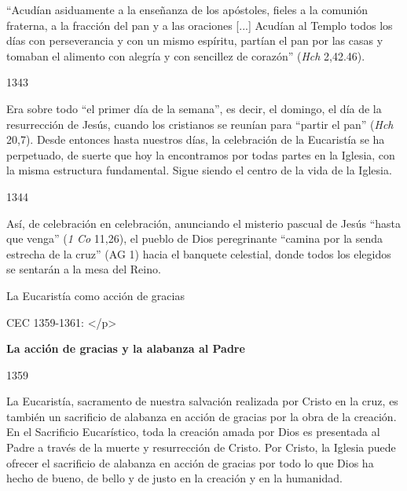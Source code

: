 			\begin{ccecite}“Acudían asiduamente a la enseñanza de los apóstoles, fieles a la comunión fraterna, a la fracción del pan y a las oraciones [...] Acudían al Templo todos los días con perseverancia y con un mismo espíritu, partían el pan por las casas y tomaban el alimento con alegría y con sencillez de corazón” (\textit{Hch} 2,42.46).\end{ccecite}
			
			\begin{ccebody}\begin{ccenumber}1343\end{ccenumber} Era sobre todo “el primer día de la semana”, es decir, el domingo, el día de la resurrección de Jesús, cuando los cristianos se reunían para “partir el pan” (\textit{Hch} 20,7). Desde entonces hasta nuestros días, la celebración de la Eucaristía se ha perpetuado, de suerte que hoy la encontramos por todas partes en la Iglesia, con la misma estructura fundamental. Sigue siendo el centro de la vida de la Iglesia.\end{ccebody}
			
			\begin{ccebody}\begin{ccenumber}1344\end{ccenumber} Así, de celebración en celebración, anunciando el misterio pascual de Jesús “hasta que venga” (\textit{1 Co} 11,26), el pueblo de Dios peregrinante “camina por la senda estrecha de la cruz” (AG 1) hacia el banquete celestial, donde todos los elegidos se sentarán a la mesa del Reino.\end{ccebody}
			
			\begin{ccetheme}La Eucaristía como acción de gracias \end{ccetheme}
			
			\begin{ccereference}\end{ccereference}CEC 1359-1361: </p>
			
			\begin{ccebody}\textbf{La acción de gracias y la alabanza al Padre}\end{ccebody}
			
			\begin{ccebody}\begin{ccenumber}1359\end{ccenumber} La Eucaristía, sacramento de nuestra salvación realizada por Cristo en la cruz, es también un sacrificio de alabanza en acción de gracias por la obra de la creación. En el Sacrificio Eucarístico, toda la creación amada por Dios es presentada al Padre a través de la muerte y resurrección de Cristo. Por Cristo, la Iglesia puede ofrecer el sacrificio de alabanza en acción de gracias por todo lo que Dios ha hecho de bueno, de bello y de justo en la creación y en la humanidad.\end{ccebody}
			
